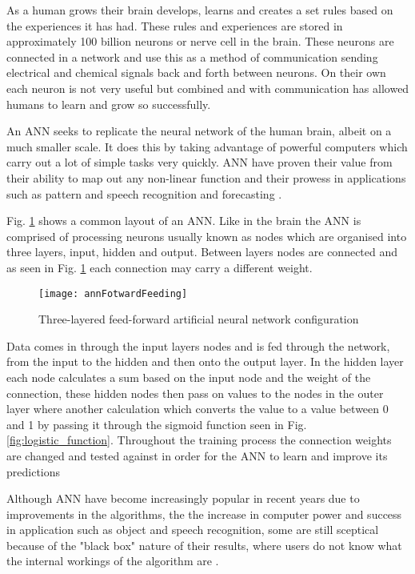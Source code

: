 As a human grows their brain develops, learns and creates a set rules based on the experiences it has had. These rules and experiences are stored in approximately 100 billion neurons or nerve cell in the brain. These neurons are connected in a network and use this as a method of communication sending electrical and chemical signals back and forth between neurons. On their own each neuron is not very useful but combined and with communication has allowed humans to learn and grow so successfully. 

An ANN seeks to replicate the neural network of the human brain, albeit on a much smaller scale. It does this by taking advantage of powerful computers which carry out a lot of simple tasks very quickly. ANN have proven their value from their ability to map out any non-linear function \citep{white_learning_1989} and their prowess in applications such as pattern and speech recognition and forecasting \citep{kaastra_forecasting_1995}.

Fig. \ref{fig:annFotwardFeeding} shows a common layout of an ANN. Like in the brain the ANN is comprised of processing neurons usually known as nodes which are organised into three layers, input, hidden and output. Between layers nodes are connected and as seen in Fig. \ref{fig:annFotwardFeeding} each connection may carry a different weight.

\begin{figure}[H]
	\texttt{[image: annFotwardFeeding]}
	\caption{Three-layered feed-forward artificial neural network configuration \\
				\cite[Source:][]{raju_development_2011}
			}
	\label{fig:annFotwardFeeding}
\end{figure}

Data comes in through the input layers nodes and is fed through the network, from the input to the hidden and then onto the output layer. In the hidden layer each node calculates a sum based on the input node and the weight of the connection, these hidden nodes then pass on values to the nodes in the outer layer where another calculation which converts the value to a value between 0 and 1 by passing it through the sigmoid function seen in Fig. \ref{fig:logistic_function}. Throughout the training process the connection weights are changed and tested against in order for the ANN to learn and improve its predictions \citep{haykin_neural_1998}

Although ANN have become increasingly popular in recent years due to improvements in the algorithms, the the increase in computer power and success in application such as object and speech recognition,  some are still sceptical because of the "black box" nature of their results, where users do not know what the internal workings of the algorithm are  \citep{kaastra_forecasting_1995}. 



